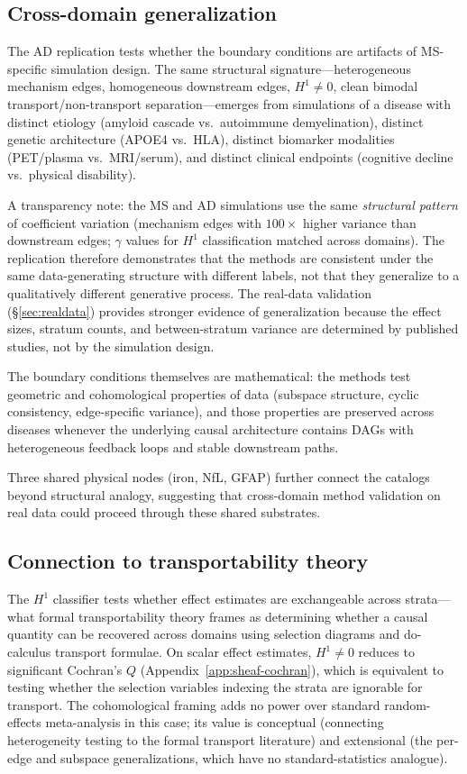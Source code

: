\documentclass{article}
\begin{document}
\subsection{Cross-domain generalization}

The AD replication tests whether the boundary conditions are artifacts of MS-specific simulation design.
The same structural signature---heterogeneous mechanism edges, homogeneous downstream edges, $H^1 \neq 0$, clean bimodal transport/non-transport separation---emerges from simulations of a disease with distinct etiology (amyloid cascade vs.\ autoimmune demyelination), distinct genetic architecture (APOE4 vs.\ HLA), distinct biomarker modalities (PET/plasma vs.\ MRI/serum), and distinct clinical endpoints (cognitive decline vs.\ physical disability).

A transparency note: the MS and AD simulations use the same \emph{structural pattern} of coefficient variation (mechanism edges with $100\times$ higher variance than downstream edges; $\gamma$ values for $H^1$ classification matched across domains).
The replication therefore demonstrates that the methods are consistent under the same data-generating structure with different labels, not that they generalize to a qualitatively different generative process.
The real-data validation (\S\ref{sec:realdata}) provides stronger evidence of generalization because the effect sizes, stratum counts, and between-stratum variance are determined by published studies, not by the simulation design.

The boundary conditions themselves are mathematical: the methods test geometric and cohomological properties of data (subspace structure, cyclic consistency, edge-specific variance), and those properties are preserved across diseases whenever the underlying causal architecture contains DAGs with heterogeneous feedback loops and stable downstream paths.

Three shared physical nodes (iron, NfL, GFAP) further connect the catalogs beyond structural analogy, suggesting that cross-domain method validation on real data could proceed through these shared substrates.

\subsection{Connection to transportability theory}

The $H^1$ classifier tests whether effect estimates are exchangeable across strata---what formal transportability theory frames as determining whether a causal quantity can be recovered across domains using selection diagrams and do-calculus transport formulae.
On scalar effect estimates, $H^1 \neq 0$ reduces to significant Cochran's $Q$ (Appendix~\ref{app:sheaf-cochran}), which is equivalent to testing whether the selection variables indexing the strata are ignorable for transport.
The cohomological framing adds no power over standard random-effects meta-analysis in this case; its value is conceptual (connecting heterogeneity testing to the formal transport literature) and extensional (the per-edge and subspace generalizations, which have no standard-statistics analogue).
\end{document}
